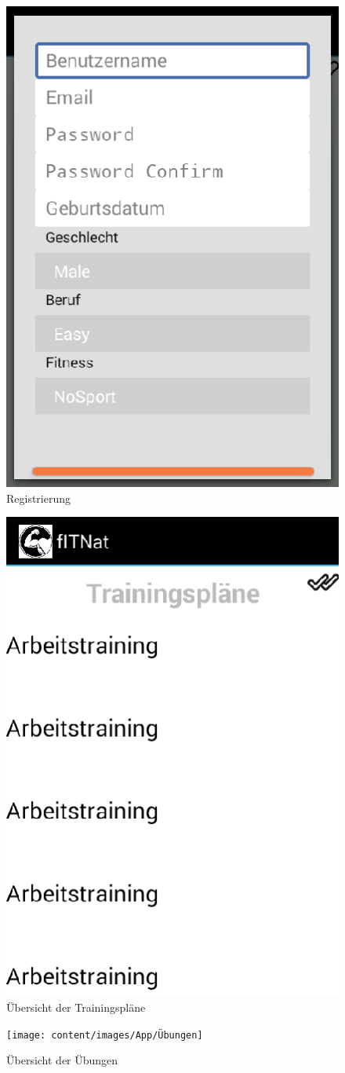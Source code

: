 \begin{figure}[!h]
\centering
\includegraphics[width=0.5\linewidth]{content/images/App/SignUp}
\caption{Registrierung}
\label{pic:natAppRegistrierung}
\end{figure}
\begin{figure}[!h]
\centering
\includegraphics[width=0.5\linewidth]{content/images/App/Trainingsplan}
\caption{Übersicht der Trainingspläne}
\label{pic:natAppTrainingspläne}
\end{figure}
\begin{figure}[!h]
\centering
\texttt{[image: content/images/App/Übungen]}
\caption{Übersicht der Übungen}
\label{pic:natAppÜbungen}
\end{figure}
